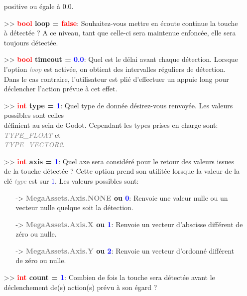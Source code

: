 \documentclass[a4paper, 11pt]{article}
\begin{document}
\begin{itemize}
		positive ou égale à 0.0.\\
		\item[>> \textbf{\textcolor{red}{bool} loop = \textcolor{red}{false}}:] Souhaitez-vous mettre en 
		écoute continue la touche à détectée ? A ce niveau, tant que celle-ci sera maintenue enfoncée, elle 
		sera toujours détectée.\\
		\item[>> \textbf{\textcolor{red}{bool} timeout = \textcolor{blue}{0.0}}:] Quel est le délai avant
		chaque détection. Lorsque l'option \textcolor{gray}{\textit{loop}} est activée, on obtient des 
		intervalles réguliers de détection. Dans le cas contraire, l'utilisateur est plié d'effectuer un 
		appuie long pour déclencher l'action prévue à cet effet.\\
		\item[>> \textbf{\textcolor{red}{int} \hypertarget{type}{type} = \textcolor{blue}{1}}:] Quel type de 
		donnée désirez-vous renvoyée. Les valeurs possibles sont celles \\définient au sein de Godot. 
		Cependant les types prises en charge sont: \textit{\textcolor{gray}{TYPE\_FLOAT}} et
		\textit{\textcolor{gray}{\\TYPE\_VECTOR2}}.\\
		\item[>> \textbf{\textcolor{red}{int} axis = \textcolor{blue}{1}}:] Quel axe sera considéré pour le 
		retour des valeurs issues de la touche détectée ? Cette option prend son utilitée lorsque la valeur
		de la clé \textcolor{gray}{\textit{type}} est sur \textcolor{blue}{1}. Les valeurs possibles sont:
		\begin{itemize}
			\item[-> \textbf{\textcolor{gray}{MegaAssets.Axis.NONE} ou \textcolor{blue}{0}}:] Renvoie une 
			valeur nulle ou un vecteur nulle quelque soit la détection.
			\item[-> \textbf{\textcolor{gray}{MegaAssets.Axis.X} ou \textcolor{blue}{1}}:] Renvoie un 
			vecteur d'abscisse différent de zéro ou nulle.
			\item[-> \textbf{\textcolor{gray}{MegaAssets.Axis.Y} ou \textcolor{blue}{2}}:] Renvoie un 
			vecteur d'ordonné différent de zéro ou nulle.\\
		\end{itemize}
		\item[>> \textbf{\textcolor{red}{int} count = \textcolor{blue}{1}}:] Combien de fois la touche sera 
		détectée avant le déclenchement de(s) action(s) prévu à son égard ?\\

\end{itemize}
\end{document}
